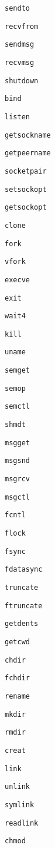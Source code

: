 \verb+sendto+

\verb+recvfrom+

\verb+sendmsg+

\verb+recvmsg+

\verb+shutdown+

\verb+bind+

\verb+listen+

\verb+getsockname+

\verb+getpeername+

\verb+socketpair+

\verb+setsockopt+

\verb+getsockopt+

\verb+clone+

\verb+fork+

\verb+vfork+

\verb+execve+

\verb+exit+

\verb+wait4+

\verb+kill+

\verb+uname+

\verb+semget+

\verb+semop+

\verb+semctl+

\verb+shmdt+

\verb+msgget+

\verb+msgsnd+

\verb+msgrcv+

\verb+msgctl+

\verb+fcntl+

\verb+flock+

\verb+fsync+

\verb+fdatasync+

\verb+truncate+

\verb+ftruncate+

\verb+getdents+

\verb+getcwd+

\verb+chdir+

\verb+fchdir+

\verb+rename+

\verb+mkdir+

\verb+rmdir+

\verb+creat+

\verb+link+

\verb+unlink+

\verb+symlink+

\verb+readlink+

\verb+chmod+

